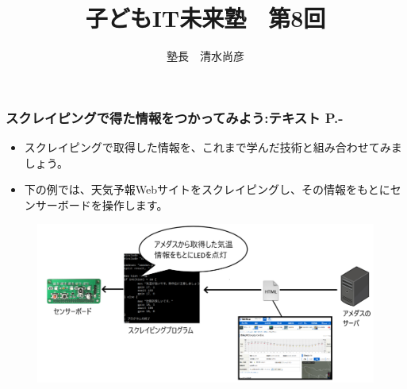 \documentclass[dvipdfmx]{beamer}
\title{子どもIT未来塾　第8回}
\author{塾長　清水尚彦}
\begin{document}

\begin{frame}[fragile]
	\frametitle{\large{スクレイピングで得た情報をつかってみよう:テキスト P.\pageref{1:P:scraping}-}~~~}
    \begin{itemize}
        \item スクレイピングで取得した情報を、これまで学んだ技術と組み合わせてみましょう。
        \item 下の例では、天気予報Webサイトをスクレイピングし、その情報をもとにセンサーボードを操作します。
    \end{itemize}
    \begin{figure}
      \centering
      \includegraphics[width=\textwidth]{slide08-img006.png}
    \end{figure}
\end{frame}
\end{document}
